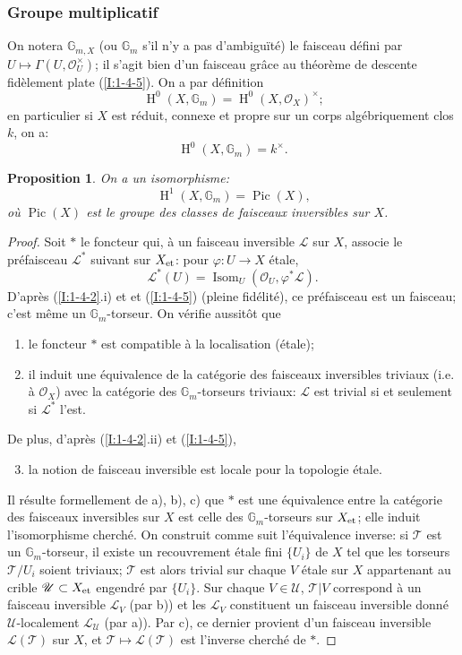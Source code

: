 \documentclass{book}
\DeclareMathOperator{\h}{H}
\DeclareMathOperator{\pic}{Pic}
\newcommand{\cL}{\mathcal{L}}
\newcommand{\cO}{\mathcal{O}}
\newcommand{\cT}{\mathcal{T}}
\newcommand{\dG}{\mathbb{G}}
\newcommand{\sU}{\mathscr{U}}
\newcommand{\et}[1]{{#1}_{\textnormal{et}}}
\newtheorem{proposition}[subsubsection]{Proposition}
\begin{document}
\subsubsection{Groupe multiplicatif}\label{I:2-2-2}

On notera $\dG_{m,X}$ (ou $\dG_m$ s'il n'y a pas d'ambiguïté) le faisceau 
défini par $U\mapsto \Gamma(U,\cO_U^\times)$; il s'agit bien d'un faisceau 
grâce au théorème de descente fidèlement plate (\ref{I:1-4-5}). On a 
par définition 
\[
  \h^0(X,\dG_m) = \h^0(X,\cO_X)^\times\text{;}
\]
en particulier si $X$ est réduit, connexe et propre sur un corps 
algébriquement clos $k$, on a:
\[
  \h^0(X,\dG_m) = k^\times\text{.}
\]

\begin{proposition}\label{I:2-2-3}
On a un isomorphisme:
\[
  \h^1(X,\dG_m) = \pic(X)\text{,}
\]
où $\pic(X)$ est le groupe des classes de faisceaux inversibles sur $X$.
\end{proposition}
\begin{proof}
Soit $*$ le foncteur qui, à un faisceau inversible $\cL$ sur $X$, associe le 
préfaisceau $\cL^*$ suivant sur $\et X$: pour $\varphi:U\to X$ étale, 
\[
  \cL^*(U)=\operatorname{Isom}_U(\cO_U,\varphi^*\cL)\text{.}
\]
D'après (\ref{I:1-4-2}.i) et et (\ref{I:1-4-5}) (pleine fidélité), ce 
préfaisceau est un faisceau; c'est même un $\dG_m$-torseur. On vérifie 
aussitôt que 
\begin{enumerate}[\indent a)]
  \item le foncteur $*$ est compatible à la localisation (étale);
  \item il induit une équivalence de la catégorie des faisceaux 
    inversibles triviaux (i.e. à $\cO_X$) avec la catégorie des 
    $\dG_m$-torseurs triviaux: $\cL$ est trivial si et seulement si $\cL^*$ 
    l'est.
\end{enumerate}

De plus, d'après (\ref{I:1-4-2}.ii) et (\ref{I:1-4-5}), 
\begin{enumerate}[\indent a)]
\setcounter{enumi}{2}
  \item la notion de faisceau inversible est locale pour la topologie étale. 
\end{enumerate}

Il résulte formellement de a), b), c) que $*$ est une équivalence entre la 
catégorie des faisceaux inversibles sur $X$ est celle des $\dG_m$-torseurs 
sur $\et X$; elle induit l'isomorphisme cherché. On construit comme suit 
l'équivalence inverse: si $\cT$ est un $\dG_m$-torseur, il existe un 
recouvrement étale fini $\{U_i\}$ de $X$ tel que les torseurs $\cT/U_i$ soient 
triviaux; $\cT$ est alors trivial sur chaque $V$ étale sur $X$ appartenant au 
crible $\sU\subset \et X$ engendré par $\{U_i\}$. Sur chaque 
$V\in\sU$, $\cT|V$ correspond à un faisceau inversible $\cL_V$ (par b)) et les 
$\cL_V$ constituent un faisceau inversible donné $\sU$-localement $\cL_\sU$ 
(par a)). Par c), ce dernier provient d'un faisceau inversible $\cL(\cT)$ sur 
$X$, et $\cT\mapsto \cL(\cT)$ est l'inverse cherché de $*$. 
\end{proof}
\end{document}
